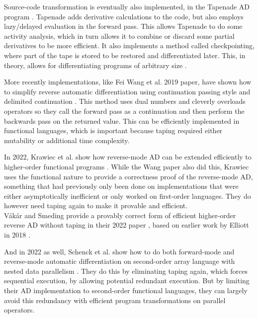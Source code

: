         Source-code transformation is eventually also implemented, in the Tapenade AD program \cite{hascoet2013tapenade}.
        Tapenade adds derivative calculations to the code, but also employs lazy/delayed evaluation in the forward pass.
        This allows Tapenade to do some activity analysis, which in turn allows it to combine or discard some partial derivatives to be more efficient.
        It also implements a method called checkpointing, where part of the tape is stored to be restored and differentiated later.
        This, in theory, allows for differentiating programs of arbitrary size \cite{griewank2008evaluating}.

        More recently implementations, like Fei Wang et al. 2019 paper, have shown how to simplify reverse automatic differentiation using continuation passing style and delimited continuation \cite{wang2019demystifying}.
        This method uses dual numbers and cleverly overloads operators so they call the forward pass as a continuation and then perform the backwards pass on the returned value.
        This can be efficiently implemented in functional languages, which is important because taping required either mutability or additional time complexity.

        In 2022, Krawiec et al. show how reverse-mode AD can be extended efficiently to higher-order functional programs \cite{krawiec2022provably}.
        While the Wang paper also did this, Krawiec uses the functional nature to provide a correctness proof of the reverse-mode AD, something that had previously only been done on implementations that were either asymptotically inefficient or only worked on first-order languages.
        They do however need taping again to make it provable and efficient.\\
        Vákár and Smeding provide a provably correct form of efficient higher-order reverse AD without taping in their 2022 paper \cite{vakar2022chad}, based on earlier work by Elliott in 2018 \cite{elliott2018simple}.

        And in 2022 as well, Schenck et al. show how to do both forward-mode and reverse-mode automatic differentiation on second-order array language with nested data parallelism \cite{schenck2022ad}.
        They do this by eliminating taping again, which forces sequential execution, by allowing potential redundant execution.
        But by limiting their AD implementation to second-order functional languages, they can largely avoid this redundancy with efficient program transformations on parallel operators.

